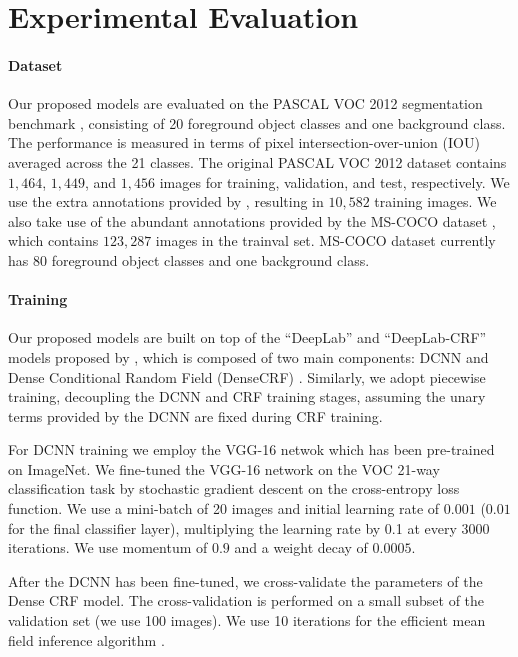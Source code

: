 \section{Experimental Evaluation}
\paragraph{Dataset} Our proposed models are evaluated on the PASCAL VOC 2012 segmentation benchmark \citep{everingham2014pascal}, consisting of 20 foreground object classes and one background class. The performance is measured in terms of pixel intersection-over-union (IOU) averaged across the 21 classes. The original PASCAL VOC 2012 dataset contains $1,464$, $1,449$, and $1,456$ images for training, validation, and test, respectively. We use the extra annotations provided by \citet{hariharan2011semantic}, resulting in $10,582$ training images. We also take use of the abundant annotations provided by the MS-COCO dataset \citep{lin2014microsoft}, which contains $123,287$ images in the trainval set. MS-COCO dataset currently has $80$ foreground object classes and one background class.

\paragraph{Training} Our proposed models are built on top of the ``DeepLab'' and ``DeepLab-CRF'' models proposed by \citep{chen2014semantic}, which is composed of two main components: DCNN and Dense Conditional Random Field (DenseCRF) \citep{krahenbuhl2011efficient}. Similarly, we adopt piecewise training, decoupling the DCNN and CRF training stages, assuming the unary terms provided by the DCNN are fixed during CRF training. 

For DCNN training we employ the VGG-16 netwok which has been pre-trained on ImageNet. We fine-tuned the VGG-16 network on the VOC 21-way classification task by stochastic gradient descent on the cross-entropy loss function. We use a mini-batch of 20 images and initial learning rate of $0.001$ ($0.01$ for the final classifier layer), multiplying the learning rate by 0.1 at every 3000 iterations. We use momentum of $0.9$ and a weight decay of $0.0005$.

After the DCNN has been fine-tuned, we cross-validate the parameters of the Dense CRF model. The cross-validation is performed on a small subset of the validation set (we use 100 images). We use 10 iterations for the efficient mean field inference algorithm \citep{krahenbuhl2011efficient}.

